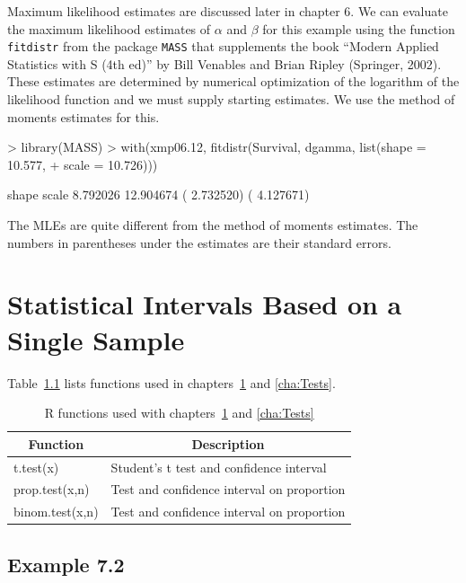 \documentclass{book}
\begin{document}
Maximum likelihood estimates are discussed later in chapter 6.
We can evaluate the maximum likelihood estimates of $\alpha$ and
$\beta$ for this example using the function \texttt{fitdistr} from the
package \texttt{MASS} that supplements the book ``Modern Applied
Statistics with S (4th ed)'' by Bill Venables and Brian Ripley
(Springer, 2002).  These estimates are determined by numerical
optimization of the logarithm of the likelihood function and we must
supply starting estimates.  We use the method of moments estimates for
this.
\begin{Schunk}
\begin{Sinput}
> library(MASS)
> with(xmp06.12, fitdistr(Survival, dgamma, list(shape = 10.577, 
+     scale = 10.726)))
\end{Sinput}
\begin{Soutput}
     shape       scale  
   8.792026   12.904674 
 ( 2.732520) ( 4.127671)
\end{Soutput}
\end{Schunk}
The MLEs are quite different from the method of moments estimates.
The numbers in parentheses under the estimates are their standard errors.


\chapter[Statistical Intervals]{Statistical Intervals Based on a Single Sample}
\label{cha:Intervals}

Table~\ref{tab:ch7} lists functions used in
chapters~\ref{cha:Intervals} and \ref{cha:Tests}.
\begin{table}[htbp]
  \centering
  \begin{tabular}{l l}
    \multicolumn{1}{c}{\textbf{Function}} &
    \multicolumn{1}{c}{\textbf{Description}} \\\hline
    t.test(x)        & Student's t test and confidence interval\\
    prop.test(x,n)   & Test and confidence interval on proportion\\
    binom.test(x,n)  & Test and confidence interval on proportion\\
    \hline
  \end{tabular}
  \caption{R functions used with chapters~\ref{cha:Intervals} and
    \ref{cha:Tests}}
  \label{tab:ch7}
\end{table}

\section{Example 7.2}
\label{sec:xmp07.02}
\end{document}
